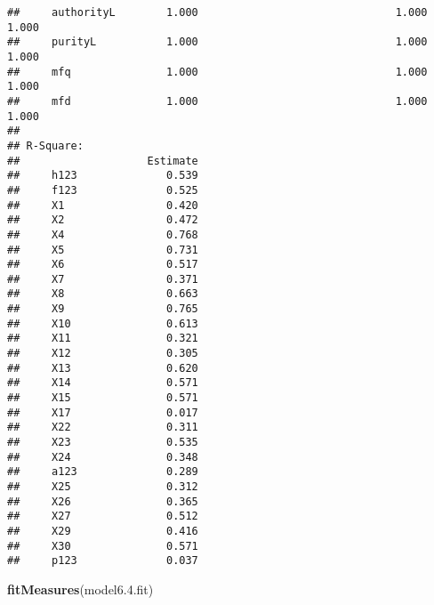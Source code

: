 \documentclass[english,man]{apa6}
\newenvironment{Shaded}{\begin{snugshade}}{\end{snugshade}}
\newcommand{\KeywordTok}[1]{\textcolor[rgb]{0.13,0.29,0.53}{\textbf{#1}}}
\newcommand{\FloatTok}[1]{\textcolor[rgb]{0.00,0.00,0.81}{#1}}
\newcommand{\NormalTok}[1]{#1}
\newcounter{author}
\theoremstyle{definition}
\theoremstyle{definition}
\theoremstyle{definition}
\theoremstyle{remark}
\begin{document}
\begin{verbatim}
##     authorityL        1.000                               1.000    1.000
##     purityL           1.000                               1.000    1.000
##     mfq               1.000                               1.000    1.000
##     mfd               1.000                               1.000    1.000
## 
## R-Square:
##                    Estimate
##     h123              0.539
##     f123              0.525
##     X1                0.420
##     X2                0.472
##     X4                0.768
##     X5                0.731
##     X6                0.517
##     X7                0.371
##     X8                0.663
##     X9                0.765
##     X10               0.613
##     X11               0.321
##     X12               0.305
##     X13               0.620
##     X14               0.571
##     X15               0.571
##     X17               0.017
##     X22               0.311
##     X23               0.535
##     X24               0.348
##     a123              0.289
##     X25               0.312
##     X26               0.365
##     X27               0.512
##     X29               0.416
##     X30               0.571
##     p123              0.037
\end{verbatim}

\begin{Shaded}
\begin{Highlighting}[]
\KeywordTok{fitMeasures}\NormalTok{(model6.}\FloatTok{4.}\NormalTok{fit) }
\end{Highlighting}
\end{Shaded}
\end{document}
